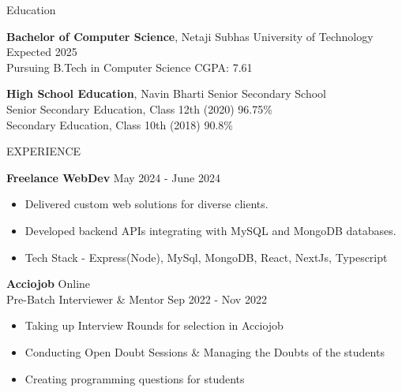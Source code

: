 \documentclass{resume} %
\begin{document}

\begin{rSection}{Education}

{\bf Bachelor of Computer Science}, Netaji Subhas University of Technology \hfill{Expected 2025}\\
Pursuing B.Tech in Computer Science \hfill CGPA: 7.61

{\bf High School Education}, Navin Bharti Senior Secondary School\\
Senior Secondary Education, Class 12th (2020) \hfill{96.75\%}\\
Secondary Education, Class 10th (2018) \hfill{90.8\%}


\end{rSection}





\begin{rSection}{EXPERIENCE}

\textbf{Freelance WebDev} \hfill May 2024 - June 2024
 \begin{itemize}
    \itemsep -3pt {} 
     \item Delivered custom web solutions for diverse clients.
     \item Developed backend APIs integrating with MySQL and MongoDB databases.
    \item Tech Stack - Express(Node), MySql, MongoDB, React, NextJs, Typescript
 \end{itemize}
 
\textbf{Acciojob} \hfill Online\\
Pre-Batch Interviewer \& Mentor \hfill{Sep 2022 - Nov 2022}
 \begin{itemize}
    \itemsep -3pt {} 
     \item  Taking up Interview Rounds for selection in Acciojob
     \item Conducting Open Doubt Sessions \& Managing the Doubts of the students
    \item Creating programming questions for students
 \end{itemize}

\end{rSection} 
\end{document}
